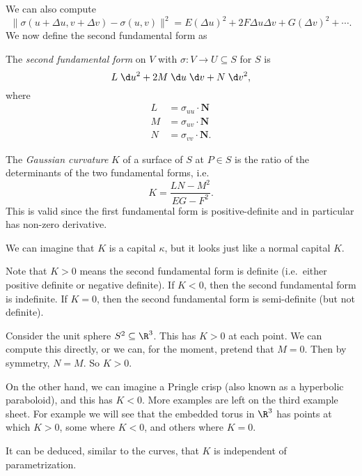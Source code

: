 \documentclass[a4paper]{article}
\begin{document}
We can also compute
\[
  \|\sigma(u + \Delta u, v + \Delta v) - \sigma(u, v)\|^2 = E (\Delta u)^2 + 2F \Delta u \Delta v + G (\Delta v)^2 + \cdots.
\]
We now define the second fundamental form as
\begin{defi}
  The \emph{second fundamental form} on $V$ with $\sigma: V \to U \subseteq S$ for $S$ is
  \[
    L \;\d u^2 + 2M \;\d u \;\d v + N \;\d v^2,
  \]
  where
  \begin{align*}
    L &= \sigma_{uu} \cdot \mathbf{N}\\
    M &= \sigma_{uv} \cdot \mathbf{N}\\
    N &= \sigma_{vv} \cdot \mathbf{N}.
  \end{align*}
\end{defi}

\begin{defi}
  The \emph{Gaussian curvature} $K$ of a surface of $S$ at $P \in S$ is the ratio of the determinants of the two fundamental forms, i.e.
  \[
    K = \frac{LN - M^2}{EG - F^2}.
  \]
  This is valid since the first fundamental form is positive-definite and in particular has non-zero derivative.
\end{defi}
We can imagine that $K$ is a capital $\kappa$, but it looks just like a normal capital $K$.

Note that $K > 0$ means the second fundamental form is definite (i.e.\ either positive definite or negative definite). If $K < 0$, then the second fundamental form is indefinite. If $K = 0$, then the second fundamental form is semi-definite (but not definite).

\begin{eg}
  Consider the unit sphere $S^2 \subseteq \R^3$. This has $K > 0$ at each point. We can compute this directly, or we can, for the moment, pretend that $M = 0$. Then by symmetry, $N = M$. So $K > 0$.

  On the other hand, we can imagine a Pringle crisp (also known as a hyperbolic paraboloid), and this has $K < 0$. More examples are left on the third example sheet. For example we will see that the embedded torus in $\R^3$ has points at which $K > 0$, some where $K < 0$, and others where $K = 0$.
\end{eg}
It can be deduced, similar to the curves, that $K$ is independent of parametrization.
\end{document}

